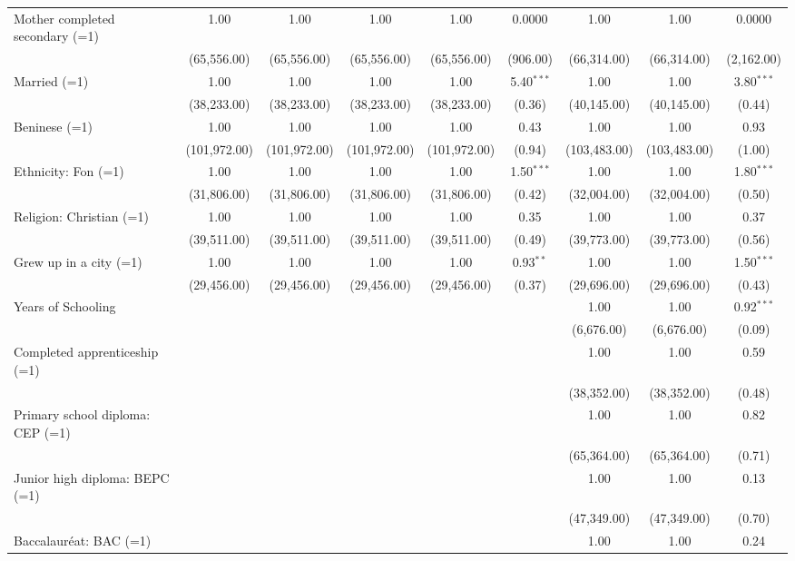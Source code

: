 \documentclass[
  a4paper, twoside, 12pt]{book}
\begin{document}
\begin{singlespacing}
\begin{table}[H]
\begin{tabular}{@{\extracolsep{-6pt}}lcccccccc}
  Mother completed secondary (=1) & 1.00 & 1.00 & 1.00 & 1.00 & 0.0000 & 1.00 & 1.00 & 0.0000 \\ 
  & (65,556.00) & (65,556.00) & (65,556.00) & (65,556.00) & (906.00) & (66,314.00) & (66,314.00) & (2,162.00) \\ 
  Married (=1) & 1.00 & 1.00 & 1.00 & 1.00 & 5.40$^{***}$ & 1.00 & 1.00 & 3.80$^{***}$ \\ 
  & (38,233.00) & (38,233.00) & (38,233.00) & (38,233.00) & (0.36) & (40,145.00) & (40,145.00) & (0.44) \\ 
  Beninese (=1) & 1.00 & 1.00 & 1.00 & 1.00 & 0.43 & 1.00 & 1.00 & 0.93 \\ 
  & (101,972.00) & (101,972.00) & (101,972.00) & (101,972.00) & (0.94) & (103,483.00) & (103,483.00) & (1.00) \\ 
  Ethnicity: Fon (=1) & 1.00 & 1.00 & 1.00 & 1.00 & 1.50$^{***}$ & 1.00 & 1.00 & 1.80$^{***}$ \\ 
  & (31,806.00) & (31,806.00) & (31,806.00) & (31,806.00) & (0.42) & (32,004.00) & (32,004.00) & (0.50) \\ 
  Religion: Christian (=1) & 1.00 & 1.00 & 1.00 & 1.00 & 0.35 & 1.00 & 1.00 & 0.37 \\ 
  & (39,511.00) & (39,511.00) & (39,511.00) & (39,511.00) & (0.49) & (39,773.00) & (39,773.00) & (0.56) \\ 
  Grew up in a city (=1) & 1.00 & 1.00 & 1.00 & 1.00 & 0.93$^{**}$ & 1.00 & 1.00 & 1.50$^{***}$ \\ 
  & (29,456.00) & (29,456.00) & (29,456.00) & (29,456.00) & (0.37) & (29,696.00) & (29,696.00) & (0.43) \\ 
  Years of Schooling &  &  &  &  &  & 1.00 & 1.00 & 0.92$^{***}$ \\ 
  &  &  &  &  &  & (6,676.00) & (6,676.00) & (0.09) \\ 
  Completed apprenticeship (=1) &  &  &  &  &  & 1.00 & 1.00 & 0.59 \\ 
  &  &  &  &  &  & (38,352.00) & (38,352.00) & (0.48) \\ 
  Primary school diploma: CEP (=1) &  &  &  &  &  & 1.00 & 1.00 & 0.82 \\ 
  &  &  &  &  &  & (65,364.00) & (65,364.00) & (0.71) \\ 
  Junior high diploma: BEPC (=1) &  &  &  &  &  & 1.00 & 1.00 & 0.13 \\ 
  &  &  &  &  &  & (47,349.00) & (47,349.00) & (0.70) \\ 
  Baccalauréat: BAC (=1) &  &  &  &  &  & 1.00 & 1.00 & 0.24 \\ 

\end{tabular}
\end{table}
\end{singlespacing}
\end{document}

